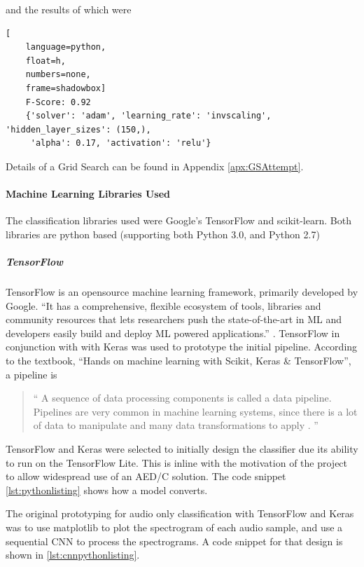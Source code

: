 \documentclass{UoNMCHA}
\newcommand{\inlineQuote}[1]{``#1''}
\newcommand{\fancyquote}[1]{\begin{quotation}\inlineQuote{#1}\end{quotation}}
\numberwithin{equation}{section}
\begin{document}
and the results of which were

\begin{lstlisting}[
    language=python,
    float=h,
    numbers=none,
    frame=shadowbox]
    F-Score: 0.92
    {'solver': 'adam', 'learning_rate': 'invscaling', 'hidden_layer_sizes': (150,),
     'alpha': 0.17, 'activation': 'relu'}
\end{lstlisting}

Details of a Grid Search can be found in Appendix \ref{apx:GSAttempt}.


\paragraph{Machine Learning Libraries Used}

The classification libraries used were Google's TensorFlow and scikit-learn. Both libraries are python based (supporting both Python 3.0, and Python 2.7) \cite{scikitlearnpythonVer}\cite{TFpythonVer}

\subparagraph{TensorFlow}
TensorFlow is an opensource machine learning framework, primarily developed by Google.
\inlineQuote{It has a comprehensive, flexible ecosystem of tools, libraries and community resources that lets researchers push the state-of-the-art in ML and developers easily build and deploy ML powered applications.} \cite{TFwebsite}. TensorFlow in conjunction with with Keras was used to prototype the initial pipeline. According to the textbook, \inlineQuote{Hands on machine learning with Scikit, Keras \& TensorFlow}, a pipeline is 
\fancyquote{
A sequence of data processing components is called a data pipeline. Pipelines are very common in machine learning systems, since there is a lot of data to manipulate and many data transformations to apply \cite{HandsOnMLTextbook}.
}

TensorFlow and Keras were selected to initially design the classifier due its ability to run on the TensorFlow Lite. This is inline with the motivation of the project to allow widespread use of an AED/C solution. The code snippet \ref{lst:pythonlisting} shows how a model converts.



The original prototyping for audio only classification with TensorFlow and Keras was to use matplotlib to plot the spectrogram of each audio sample, and use a sequential CNN to process the spectrograms. A code snippet for that design is shown in \ref{lst:cnnpythonlisting}.
\end{document}
